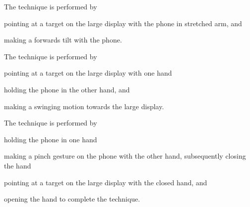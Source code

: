 The \tilt technique is performed by 
\begin{enumerate*}[label=\itshape\arabic*\upshape)]
	\item{pointing at a target on the large display with the phone in stretched arm, and}
	\item{making a forwards tilt with the phone.}
\end{enumerate*}

The \throw technique is performed by 
\begin{enumerate*}[label=\itshape\arabic*\upshape)]
	\item{pointing at a target on the large display with one hand} 
	\item{holding the phone in the other hand, and}
	\item{making a swinging motion towards the large display.}
\end{enumerate*}

The \pinch technique is performed by 
\begin{enumerate*}[label=\itshape\arabic*\upshape)]
	\item{holding the phone in one hand} 
	\item{making a pinch gesture on the phone with the other hand, subsequently closing the hand}
	\item{pointing at a target on the large display with the closed hand, and}
	\item{opening the hand to complete the technique.}
\end{enumerate*}
